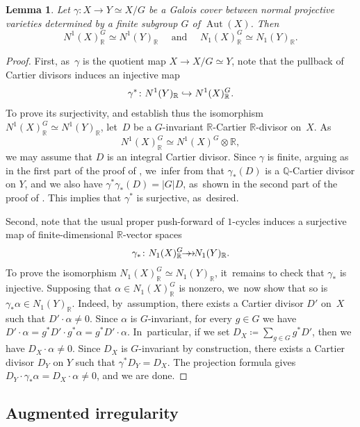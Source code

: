 \documentclass[JEP,XML,SOM,Unicode,published]{cedram}
\newcommand\hto{\mathrel{\lhook\joinrel\to}}
\newcommand{\onto}{\mathchoice{\to\hspace*{-5mm}\to}{\mathrel{\hbox{$\to\hspace*{-2.85mm}\to$}}}{\to\hspace*{-3mm}\to}{\to\hspace*{-3mm}\to}}
\theoremstyle{plain}
\newtheorem{lem}[thm]{Lemma}
\theoremstyle{definition}
\newcommand{\Q}{\mathbb{Q}}
\newcommand{\R}{\mathbb{R}}
\DeclareMathOperator{\Aut}{Aut}
\begin{document}
\begin{lem}
\label{lem:NeronSeveri_GaloisCovering}
Let $\gamma \colon X\to Y \simeq X/G$ be a Galois cover between normal projective varieties determined by a finite subgroup $G$ of $\Aut(X)$. Then
\[
N^1(X)_{\R}^G \simeq N^1(Y)_{\R} \quad \text{ and } \quad N_1(X)_{\R}^G \simeq N_1(Y)_{\R}.
\]
\end{lem}

\begin{proof}
First, as~$\gamma$ is the quotient map $X \to X/G \simeq Y$, note that the pullback of Cartier divisors induces an injective map
\[
\gamma^* \colon N^1(Y)_{\R} \hto N^1(X)_{\R}^G.
\]
To prove its surjectivity, and establish thus the isomorphism $N^1(X)_{\R}^G \simeq N^1(Y)_{\R}$, let~$D$ be a $G$\nobreakdash-invariant $\R$-Cartier $\R$\nobreakdash-divisor on~$X$. As
\[
N^1(X)_{\R}^G \simeq N^1(X)^G \otimes \R,
\]
we may assume that $D$ is an integral Cartier divisor.
Since $\gamma$ is finite, arguing as in the first part of the proof of \cite[Lem.\,1.1.3]{Pro21}, we~infer from \cite[Ch.\,7, Rem.\,2.19]{Liu02book} that $\gamma_* (D)$ is a $\Q$\nobreakdash-Cartier divisor on $Y$, and we also have $\gamma^* \gamma_* (D) = |G|D$, as~shown in the second part of the proof of \cite[Lem.\,1.1.3]{Pro21}. This implies that $\gamma^*$ is surjective, as~desired.

Second, note that the usual proper push-forward of $1$\nobreakdash-cycles induces a surjective map of finite-dimensional $\R$-vector spaces
\[
\gamma_*\colon N_1(X)_{\R}^G \onto N_1(Y)_{\R}.
\]
To prove the isomorphism $N_1(X)_{\R}^G \simeq N_1(Y)_{\R}$, it~remains to check that $\gamma_*$ is injective. Supposing that $\alpha\in N_1(X)_{\R}^G$ is nonzero, we~now show that so is $\gamma_*\alpha \in N_1(Y)_\R$. Indeed, by~assumption, there exists a Cartier divisor $D'$ on~$X$ such that $D'\cdot \alpha\neq 0$. Since $\alpha$ is $G$\nobreakdash-invariant, for every $g\in G$ we have $D'\cdot \alpha = g^*D'\cdot g^*\alpha = g^*D'\cdot \alpha$. In~particular, if we set $D_X \coloneqq \sum_{g\in G}g^*D'$, then we have $D_X\cdot \alpha \neq 0$. Since $D_X$ is $G$\nobreakdash-invariant by construction, there exists a Cartier divisor $D_Y$ on $Y$ such that $\gamma^*D_Y=D_X$. The projection formula gives $D_Y\cdot \gamma_*\alpha=D_X\cdot \alpha \neq 0$, and we are done.
\end{proof}

\subsection{Augmented irregularity}
\end{document}
